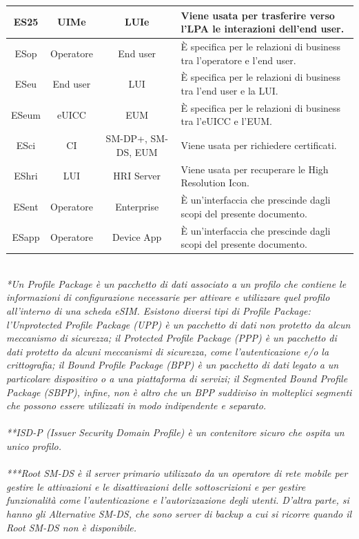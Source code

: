 \documentclass[10pt, twoside, openany]{book}
\begin{document}
\begin{table}[h!]
\begin{center}
\begin{tabularx}{\textwidth}{|c|c|c|X|}
\hline
ES25 & UIMe & LUIe & Viene usata per trasferire verso l'LPA le interazioni dell'end user.\\
\hline
ESop & Operatore & End user & È specifica per le relazioni di business tra l'operatore e l'end user.\\
\hline
ESeu & End user & LUI & È specifica per le relazioni di business tra l'end user e la LUI.\\
\hline
ESeum & eUICC & EUM & È specifica per le relazioni di business tra l'eUICC e l'EUM.\\
\hline
ESci & CI & SM-DP+, SM-DS, EUM & Viene usata per richiedere certificati.\\
\hline
EShri & LUI & HRI Server & Viene usata per recuperare le High Resolution Icon.\\
\hline
ESent & Operatore & Enterprise & È un'interfaccia che prescinde dagli scopi del presente documento.\\
\hline
ESapp & Operatore & Device App & È un'interfaccia che prescinde dagli scopi del presente documento.\\
\hline
\end{tabularx}
\end{center}
\end{table}
\\\textit{*Un Profile Package è un pacchetto di dati associato a un profilo che contiene le informazioni di configurazione necessarie per attivare e utilizzare quel profilo all'interno di una scheda eSIM. Esistono diversi tipi di Profile Package: l'Unprotected Profile Package (UPP) è un pacchetto di dati non protetto da alcun meccanismo di sicurezza; il Protected Profile Package (PPP) è un pacchetto di dati protetto da alcuni meccanismi di sicurezza, come l'autenticazione e/o la crittografia; il Bound Profile Package (BPP) è un pacchetto di dati legato a un particolare dispositivo o a una piattaforma di servizi; il Segmented Bound Profile Package (SBPP), infine, non è altro che un BPP suddiviso in molteplici segmenti che possono essere utilizzati in modo indipendente e separato.}\\ \\
\textit{**ISD-P (Issuer Security Domain Profile) è un contenitore sicuro che ospita un unico profilo.}\\ \\
\textit{***Root SM-DS è il server primario utilizzato da un operatore di rete mobile per gestire le attivazioni e le disattivazioni delle sottoscrizioni e per gestire funzionalità come l'autenticazione e l'autorizzazione degli utenti. D'altra parte, si hanno gli Alternative SM-DS, che sono server di backup a cui si ricorre quando il Root SM-DS non è disponibile.}
\end{document}
